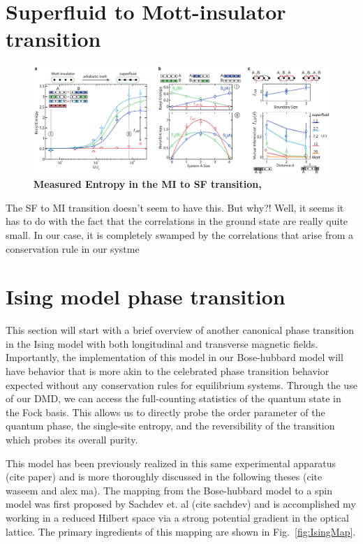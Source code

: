 \section{Superfluid to Mott-insulator transition}

\begin{figure}[h!]
		\includegraphics[width=\columnwidth]{figures/ch3/sf_mi_data/fig5.pdf} 
		\caption{\textbf{Measured Entropy in the MI to SF transition,}   }
		\label{fig:sf_mi_fig}	
\end{figure}


The SF to MI transition doesn't seem to have this. But why?! Well, it seems it has to do with the fact that the correlations in the ground state are really quite small. In our case, it is completely swamped by the correlations that arise from a conservation rule in our systme

\section{Ising model phase transition}

This section will start with a brief overview of another canonical phase transition in the Ising model with both longitudinal and transverse magnetic fields. Importantly, the implementation of this model in our Bose-hubbard model will have behavior that is more akin to the celebrated phase transition behavior expected without any conservation rules for equilibrium systems. Through the use of our DMD, we can access the full-counting statistics of the quantum state in the Fock basis. This allows us to directly probe the order parameter of the quantum phase, the single-site entropy, and the reversibility of the transition which probes its overall purity.

This model has been previously realized in this same experimental apparatus (cite paper) and is more thoroughly discussed in the following theses (cite waseem and alex ma).  The mapping from the Bose-hubbard model to a spin model was first proposed by Sachdev et. al (cite sachdev) and is accomplished my working in a reduced Hilbert space via a strong potential gradient in the optical lattice. The primary ingredients of this mapping are shown in Fig.~\ref{fig:IsingMap}.

